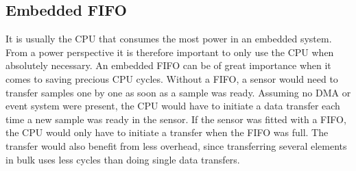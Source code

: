 

\subsection{Embedded FIFO}

It is usually the CPU that consumes the most power in an embedded system. From a power perspective it is therefore important to only use the CPU when absolutely necessary. An embedded FIFO can be of great importance when it comes to saving precious CPU cycles. Without a FIFO, a sensor would need to transfer samples one by one as soon as a sample was ready. Assuming no DMA or event system were present, the CPU would have to initiate a data transfer each time a new sample was ready in the sensor. If the sensor was fitted with a FIFO, the CPU would only have to initiate a transfer when the FIFO was full. The transfer would also benefit from less overhead, since transferring several elements in bulk uses less cycles than doing single data transfers. 

